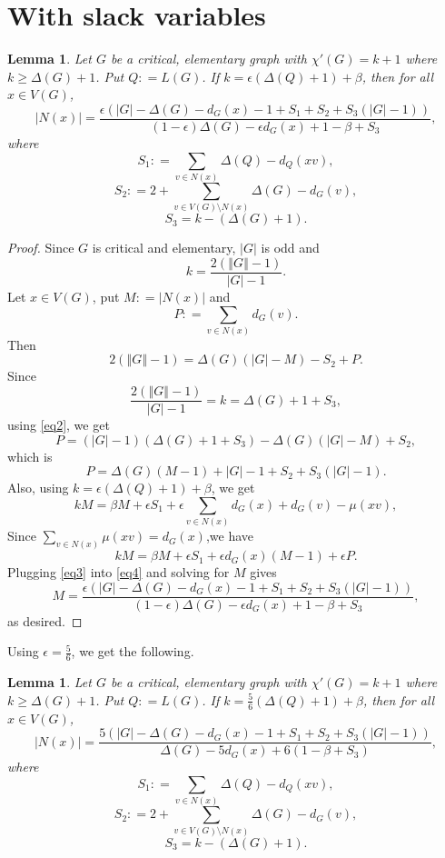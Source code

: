 \documentclass[12pt]{amsart}
\theoremstyle{plain}
\newtheorem{lem}[thm]{Lemma}
\theoremstyle{definition}
\theoremstyle{remark}
\newcommand{\card}[1]{\left|#1\right|}
\newcommand{\size}[1]{\left\Vert#1\right\Vert}
\newcommand{\parens}[1]{\left( #1 \right)}
\newcommand{\DefinedAs}{\mathrel{\mathop:}=}
\begin{document}
\section{With slack variables}
\begin{lem}
Let $G$ be a critical, elementary graph with $\chi'(G) = k + 1$ where $k \ge \Delta(G) + 1$.  Put $Q \DefinedAs L(G)$.  
If $k = \epsilon\parens{\Delta(Q) + 1} + \beta$, then for all $x \in V(G)$,
\[\card{N(x)} = \frac{\epsilon\parens{|G| - \Delta(G) - d_G(x) - 1 + S_1 + S_2 + S_3\parens{\card{G} - 1}}}{(1-\epsilon)\Delta(G) - \epsilon d_G(x) + 1 - \beta + S_3},\]
where 
\[S_1 \DefinedAs \sum_{v \in N(x)} \Delta(Q) - d_Q(xv),\]
\[S_2 \DefinedAs 2 + \sum_{v \in V(G) \setminus N(x)} \Delta(G) - d_G(v),\]
\[S_3 = k - (\Delta(G) + 1).\]
\end{lem}
\begin{proof}
Since $G$ is critical and elementary, $\card{G}$ is odd and
\begin{equation}\label{eq1}
k = \frac{2(\size{G} - 1)}{\card{G} - 1}.
\end{equation}
Let $x \in V(G)$, put $M \DefinedAs \card{N(x)}$ and 
\[P \DefinedAs \sum_{v \in N(x)} d_G(v).\] 
Then
\begin{equation}\label{eq2}
2(\size{G} - 1) = \Delta(G)(|G| - M) - S_2 + P.
\end{equation}
Since 
\[\frac{2(\size{G} - 1)}{\card{G} - 1} = k = \Delta(G) + 1 + S_3,\]
using \eqref{eq2}, we get
\[P = (|G| - 1)(\Delta(G) + 1 + S_3) - \Delta(G)(|G| - M) + S_2,\]
which is
\begin{equation}\label{eq3}
P = \Delta(G)(M-1) + |G| - 1 + S_2 + S_3(|G| - 1).
\end{equation}
Also, using $k = \epsilon\parens{\Delta(Q) + 1} + \beta$, we get
\[kM = \beta M + \epsilon S_1 + \epsilon\sum_{v \in N(x)} d_G(x) + d_G(v) - \mu(xv),\]
Since $\sum_{v \in N(x)} \mu(xv) = d_G(x)$,we have
\begin{equation}\label{eq4}
kM = \beta M + \epsilon S_1 + \epsilon d_G(x)(M - 1) + \epsilon P.
\end{equation}
Plugging \eqref{eq3} into \eqref{eq4} and solving for $M$ gives
\[M= \frac{\epsilon\parens{|G| - \Delta(G) - d_G(x) - 1 + S_1 + S_2 + S_3\parens{\card{G} - 1}}}{(1-\epsilon)\Delta(G) - \epsilon d_G(x) + 1 - \beta + S_3},\]
as desired.
\end{proof}

Using $\epsilon = \frac56$, we get the following.

\begin{lem}\label{Slacked56}
Let $G$ be a critical, elementary graph with $\chi'(G) = k + 1$ where $k \ge \Delta(G) + 1$.  Put $Q \DefinedAs L(G)$. 
If $k = \frac56\parens{\Delta(Q) + 1} + \beta$, then for all $x \in V(G)$,
\[\card{N(x)} = \frac{5\parens{|G| - \Delta(G) - d_G(x) - 1 + S_1 + S_2 + S_3\parens{\card{G} - 1}}}{\Delta(G) - 5 d_G(x) + 6(1 - \beta + S_3)},\]
where 
\[S_1 \DefinedAs \sum_{v \in N(x)} \Delta(Q) - d_Q(xv),\]
\[S_2 \DefinedAs 2 + \sum_{v \in V(G) \setminus N(x)} \Delta(G) - d_G(v),\]
\[S_3 = k - (\Delta(G) + 1).\]
\end{lem}
\end{document}
